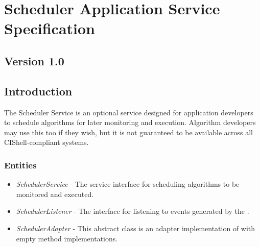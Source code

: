 \chapter{Scheduler Application Service Specification}

\section*{Version 1.0}

\section{Introduction}

The Scheduler Service is an optional service designed for application developers
to schedule algorithms for later monitoring and execution. Algorithm developers
may use this too if they wish, but it is not guaranteed to be available across
all CIShell-compliant systems.

\subsection{Entities}

\begin{itemize}
  \item \textit{SchedulerService} - The service interface for scheduling
  algorithms to be monitored and executed.
  \item \textit{SchedulerListener} - The interface for listening to events
  generated by the .
  \item \textit{SchedulerAdapter} - This abstract class is an adapter
  implementation of  with empty method
  implementations.
\end{itemize}

\orgcishellappservicescheduler{}
